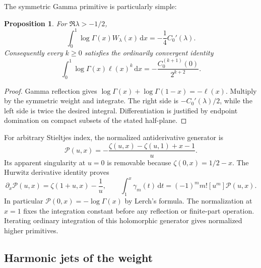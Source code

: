 \documentclass[11pt]{article}
\numberwithin{equation}{section}
\newtheorem{proposition}[theorem]{Proposition}
\theoremstyle{definition}
\theoremstyle{remark}
\newcommand{\dd}{\,\mathrm d}
\begin{document}
The symmetric Gamma primitive is particularly simple:
\begin{proposition}\label{beta:gammaprimitive}
For $\Re\lambda>-1/2$,
\begin{equation}\label{beta:gamma}
 \int_0^1\log\Gamma(x)W_\lambda(x)\dd x=-\frac14C_0'(\lambda).
\end{equation}
Consequently every $k\geq0$ satisfies the ordinarily convergent identity
\begin{equation}\label{beta:gammalogs}
 \int_0^1\log\Gamma(x)\ell(x)^k\dd x
 =-\frac{C_0^{(k+1)}(0)}{2^{k+2}}.
\end{equation}
\end{proposition}
\begin{proof}
Gamma reflection gives
$\log\Gamma(x)+\log\Gamma(1-x)=-\ell(x)$. Multiply by the symmetric
weight and integrate. The right side is $-C_0'(\lambda)/2$, while
the left side is twice the desired integral. Differentiation is
justified by endpoint domination on compact subsets of the stated
half-plane.
\end{proof}

For arbitrary Stieltjes index, the normalized antiderivative generator
is
\begin{equation}\label{beta:primitivegenerator}
 \mathcal P(u,x)=-\frac{\zeta(u,x)-\zeta(u,1)+x-1}{u}.
\end{equation}
Its apparent singularity at $u=0$ is removable because
$\zeta(0,x)=1/2-x$. The Hurwitz derivative identity proves
\begin{equation}\label{beta:primitivecoeff}
 \partial_x\mathcal P(u,x)=\zeta(1+u,x)-\frac1u,
 \qquad
 \int_1^x\gamma_m(t)\dd t=(-1)^m m![u^m]\mathcal P(u,x).
\end{equation}
In particular $\mathcal P(0,x)=-\log\Gamma(x)$ by Lerch's formula.
The normalization at $x=1$ fixes the integration constant before any
reflection or finite-part operation. Iterating ordinary integration
of this holomorphic generator gives normalized higher primitives.

\subsection{Harmonic jets of the weight}
\end{document}

